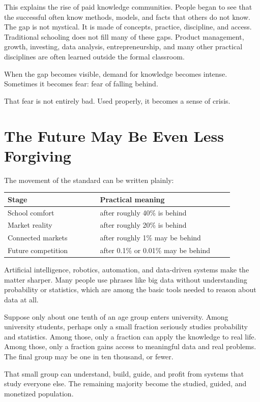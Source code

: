This explains the rise of paid knowledge communities. People began to see that the successful often know methods, models, and facts that others do not know. The gap is not mystical. It is made of concepts, practice, discipline, and access. Traditional schooling does not fill many of these gaps. Product management, growth, investing, data analysis, entrepreneurship, and many other practical disciplines are often learned outside the formal classroom.

When the gap becomes visible, demand for knowledge becomes intense. Sometimes it becomes fear: fear of falling behind.

That fear is not entirely bad. Used properly, it becomes a sense of crisis.

\section*{The Future May Be Even Less Forgiving}

The movement of the standard can be written plainly:

\begin{center}
\begin{tabular}{p{0.36\linewidth}p{0.52\linewidth}}
\hline
Stage & Practical meaning \\
\hline
School comfort & after roughly 40\% is behind \\
Market reality & after roughly 20\% is behind \\
Connected markets & after roughly 1\% may be behind \\
Future competition & after 0.1\% or 0.01\% may be behind \\
\hline
\end{tabular}
\end{center}

Artificial intelligence, robotics, automation, and data-driven systems make the matter sharper. Many people use phrases like big data without understanding probability or statistics, which are among the basic tools needed to reason about data at all.

Suppose only about one tenth of an age group enters university. Among university students, perhaps only a small fraction seriously studies probability and statistics. Among those, only a fraction can apply the knowledge to real life. Among those, only a fraction gains access to meaningful data and real problems. The final group may be one in ten thousand, or fewer.

That small group can understand, build, guide, and profit from systems that study everyone else. The remaining majority become the studied, guided, and monetized population.

